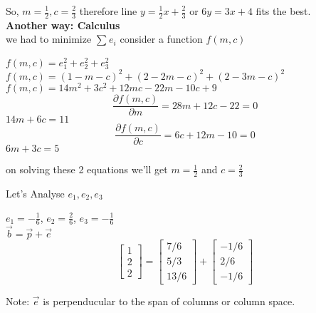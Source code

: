 \documentclass[a4paper,11pt]{article}
\numberwithin{equation}{section}
\begin{document}
\begin{itemize}
So, $m=\frac{1}{2},c=\frac{2}{3}$ therefore line $y=\frac{1}{2}x+\frac{2}{3}$ or $6y=3x+4$ fits the best.\\

\textbf{Another way: Calculus}\\
we had to minimize $\sum_{}^{}e_i$ consider a function $f(m,c)$
\begin{center}
    $f(m,c)=e_1^2+e_2^2+e_3^2$
    \\ \vspace{5pt}
    $f(m,c)=(1-m-c)^2+(2-2m-c)^2+(2-3m-c)^2$
    \\ \vspace{5pt}
    $f(m,c)=14m^2+3c^2+12mc-22m-10c+9$
\begin{equation}
    \frac{\partial f(m,c)}{\partial m}=28m+12c-22=0
\end{equation}
$14m+6c=11$
\begin{equation}
    \frac{\partial f(m,c)}{\partial c}=6c+12m-10=0
\end{equation}
$6m+3c=5$
\end{center}

on solving these 2 equations we'll get $m=\frac{1}{2}$ and $c=\frac{2}{3} $


Let's Analyse $e_1,e_2,e_3$
\begin{center}
    $e_1=-\frac{1}{6}$,\hspace{3pt}
    $e_2=\frac{2}{6}$,\hspace{3pt}
    $e_3=-\frac{1}{6}$\\
    \vspace{3pt}
$\vec{b}=\vec{p}+\vec{e}$
\[
    \begin{bmatrix}
        1\\2\\2
    \end{bmatrix}=
    \begin{bmatrix}
        7/6\\5/3\\13/6
    \end{bmatrix}+
    \begin{bmatrix}
        -1/6\\2/6\\-1/6
    \end{bmatrix}
\]
\end{center}
Note: $\vec{e}$ is perpenducular to the span of columns or column space.\\


\end{itemize}
\end{document}
